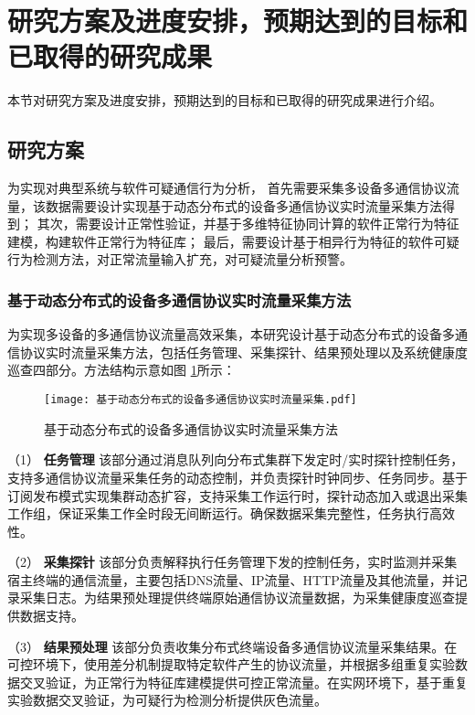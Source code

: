 
\section{研究方案及进度安排，预期达到的目标和已取得的研究成果}
本节对研究方案及进度安排，预期达到的目标和已取得的研究成果进行介绍。
\subsection{研究方案}

为实现对典型系统与软件可疑通信行为分析，
首先需要采集多设备多通信协议流量，该数据需要设计实现基于动态分布式的设备多通信协议实时流量采集方法得到；
其次，需要设计正常性验证，并基于多维特征协同计算的软件正常行为特征建模，构建软件正常行为特征库；
最后，需要设计基于相异行为特征的软件可疑行为检测方法，对正常流量输入扩充，对可疑流量分析预警。


\subsubsection{基于动态分布式的设备多通信协议实时流量采集方法}

为实现多设备的多通信协议流量高效采集，本研究设计基于动态分布式的设备多通信协议实时流量采集方法，包括任务管理、采集探针、结果预处理以及系统健康度巡查四部分。方法结构示意如图 \ref{fig:基于动态分布式的设备多通信协议实时流量采集方法}所示：
\FloatBarrier
 
\begin{figure}[ht]
  \centering
  \texttt{[image: 基于动态分布式的设备多通信协议实时流量采集.pdf]}
  \caption{基于动态分布式的设备多通信协议实时流量采集方法}
  \label{fig:基于动态分布式的设备多通信协议实时流量采集方法}
\end{figure} 

\FloatBarrier

（1） \textbf{任务管理}\quad
该部分通过消息队列向分布式集群下发定时/实时探针控制任务，支持多通信协议流量采集任务的动态控制，并负责探针时钟同步、任务同步。基于订阅发布模式实现集群动态扩容，支持采集工作运行时，探针动态加入或退出采集工作组，保证采集工作全时段无间断运行。确保数据采集完整性，任务执行高效性。

（2） \textbf{采集探针}\quad
该部分负责解释执行任务管理下发的控制任务，实时监测并采集宿主终端的通信流量，主要包括DNS流量、IP流量、HTTP流量及其他流量，并记录采集日志。为结果预处理提供终端原始通信协议流量数据，为采集健康度巡查提供数据支持。

（3） \textbf{结果预处理}\quad
该部分负责收集分布式终端设备多通信协议流量采集结果。在可控环境下，使用差分机制提取特定软件产生的协议流量，并根据多组重复实验数据交叉验证，为正常行为特征库建模提供可控正常流量。在实网环境下，基于重复实验数据交叉验证，为可疑行为检测分析提供灰色流量。

